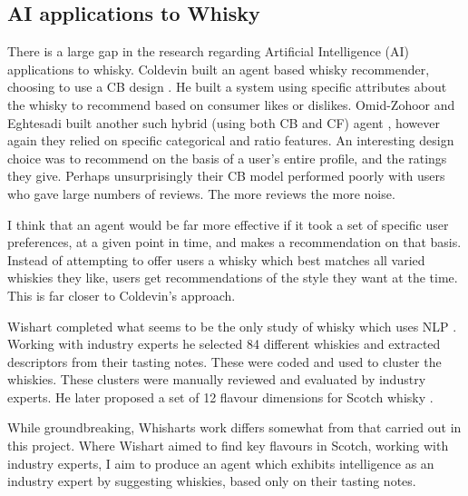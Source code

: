 \subsection{AI applications to Whisky}\label{ssec:ml2whisk}

There is a large gap in the research regarding Artificial Intelligence (AI) applications to whisky.
Coldevin built an agent based whisky recommender, choosing to use a CB design \cite{Coldevin2005}.  He 
built a system using specific attributes about the whisky to recommend based
on consumer likes or dislikes. Omid-Zohoor and Eghtesadi built another such hybrid (using both CB and CF) 
agent \cite{Omidzohoor}, however again they relied on specific categorical and ratio features.
An interesting design choice was to recommend on the basis of a user's entire profile, and the 
ratings they give.  Perhaps unsurprisingly their CB model performed poorly with users who gave large 
numbers of reviews. The more reviews the more noise.

I think that an agent would be far more effective if it took a set of specific user preferences,
at a given point in time, and makes a recommendation on that basis.  Instead of attempting
to offer users a whisky which best matches all varied whiskies they like, users get
recommendations of the style they want at the time.  This is far 
closer to Coldevin's approach.

Wishart completed what seems to be the only study of whisky which uses NLP \cite{Wishart2000}.
Working with industry experts he selected 84 different whiskies and extracted descriptors from their tasting notes. 
These were coded and used to cluster the whiskies. These clusters were manually reviewed and evaluated by 
industry experts.  He later proposed a set of 12 flavour dimensions for Scotch whisky \cite{Wishart2009}.

While groundbreaking, Whisharts work differs somewhat from that carried out in this project.  Where Wishart aimed to find
key flavours in Scotch, working with industry experts, I aim to produce an agent which exhibits intelligence as an 
industry expert by suggesting whiskies, based only on their tasting notes.

